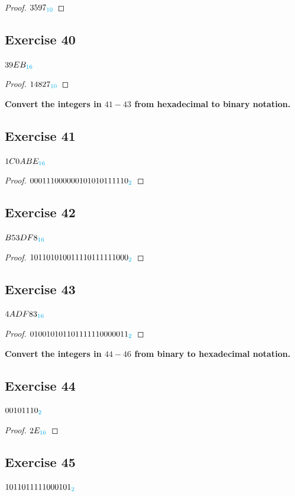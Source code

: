 \documentclass[14pt]{extarticle}
\newcommand{\base}[1]{{\color{cyan}#1}}
\begin{document}
\begin{proof}
$3597_\base{10}$
\end{proof}

\subsection{Exercise 40}
$39EB_\base{16}$

\begin{proof}
$14827_\base{10}$
\end{proof}

{\bf \color{cyan} Convert the integers in $41-43$ from hexadecimal to binary notation.}

\subsection{Exercise 41}
$1C0ABE_\base{16}$

\begin{proof}
$000111000000101010111110_\base{2}$
\end{proof}

\subsection{Exercise 42}
$B53DF8_\base{16}$

\begin{proof}
$101101010011110111111000_\base{2}$
\end{proof}

\subsection{Exercise 43}
$4ADF83_\base{16}$

\begin{proof}
$010010101101111110000011_\base{2}$
\end{proof}

{\bf \color{cyan} Convert the integers in $44-46$ from binary to hexadecimal notation.}

\subsection{Exercise 44}
$00101110_\base{2}$

\begin{proof}
$2E_\base{16}$
\end{proof}

\subsection{Exercise 45}
$1011011111000101_\base{2}$
\end{document}
